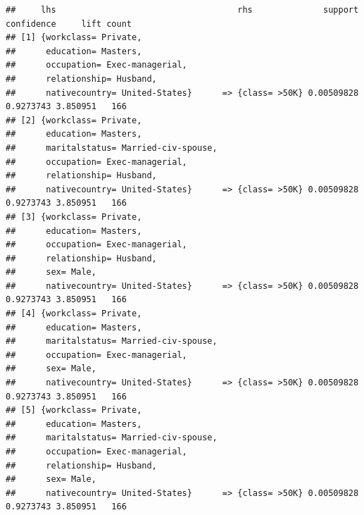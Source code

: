 \documentclass[]{article}
\begin{document}
\begin{verbatim}
##     lhs                                    rhs              support confidence     lift count
## [1] {workclass= Private,                                                                     
##      education= Masters,                                                                     
##      occupation= Exec-managerial,                                                            
##      relationship= Husband,                                                                  
##      nativecountry= United-States}      => {class= >50K} 0.00509828  0.9273743 3.850951   166
## [2] {workclass= Private,                                                                     
##      education= Masters,                                                                     
##      maritalstatus= Married-civ-spouse,                                                      
##      occupation= Exec-managerial,                                                            
##      relationship= Husband,                                                                  
##      nativecountry= United-States}      => {class= >50K} 0.00509828  0.9273743 3.850951   166
## [3] {workclass= Private,                                                                     
##      education= Masters,                                                                     
##      occupation= Exec-managerial,                                                            
##      relationship= Husband,                                                                  
##      sex= Male,                                                                              
##      nativecountry= United-States}      => {class= >50K} 0.00509828  0.9273743 3.850951   166
## [4] {workclass= Private,                                                                     
##      education= Masters,                                                                     
##      maritalstatus= Married-civ-spouse,                                                      
##      occupation= Exec-managerial,                                                            
##      sex= Male,                                                                              
##      nativecountry= United-States}      => {class= >50K} 0.00509828  0.9273743 3.850951   166
## [5] {workclass= Private,                                                                     
##      education= Masters,                                                                     
##      maritalstatus= Married-civ-spouse,                                                      
##      occupation= Exec-managerial,                                                            
##      relationship= Husband,                                                                  
##      sex= Male,                                                                              
##      nativecountry= United-States}      => {class= >50K} 0.00509828  0.9273743 3.850951   166
\end{verbatim}
\end{document}
